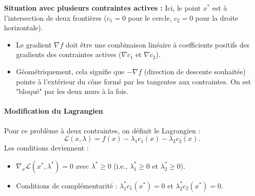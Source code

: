 \begin{figureexplanation}
\textbf{Situation avec plusieurs contraintes actives :}
Ici, le point $x^*$ est à l'intersection de deux frontières ($c_1=0$ pour le cercle, $c_2=0$ pour la droite horizontale).
\begin{itemize}
    \item Le gradient $\nabla f$ doit être une combinaison linéaire à coefficients positifs des gradients des contraintes actives ($\nabla c_1$ et $\nabla c_2$).
    \item Géométriquement, cela signifie que $-\nabla f$ (direction de descente souhaitée) pointe à l'extérieur du cône formé par les tangentes aux contraintes. On est "bloqué" par les deux murs à la fois.
\end{itemize}
\end{figureexplanation}

\paragraph{Modification du Lagrangien}
Pour ce problème à deux contraintes, on définit le Lagrangien :
\begin{equation}
    \mathcal{L}(x, \lambda) = f(x) - \lambda_1 c_1(x) - \lambda_2 c_2(x).
\end{equation}
Les conditions deviennent :
\begin{itemize}
    \item $\nabla_x \mathcal{L}(x^*, \lambda^*) = 0$ avec $\lambda^* \ge 0$ (i.e., $\lambda_1^* \ge 0$ et $\lambda_2^* \ge 0$).
    \item Conditions de complémentarité : $\lambda_1^* c_1(x^*) = 0$ et $\lambda_2^* c_2(x^*) = 0$.
\end{itemize}

